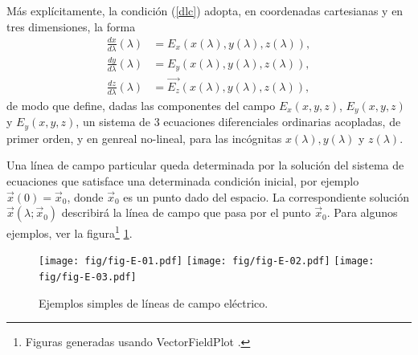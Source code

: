 Más explícitamente, la condición (\ref{dlc}) adopta, en coordenadas cartesianas y en tres dimensiones, la forma 
\begin{align}
\frac{dx}{d\lambda}(\lambda) &= {E_x}(x(\lambda),y(\lambda),z(\lambda)), \\
\frac{dy}{d\lambda}(\lambda) &= {E_y}(x(\lambda),y(\lambda),z(\lambda)),\\
\frac{dz}{d\lambda}(\lambda) &= \vec{E_z}(x(\lambda),y(\lambda),z(\lambda)),
\end{align}
de modo que define, dadas las componentes del campo $E_x(x,y,z)$, $E_y(x,y,z)$ y $E_y(x,y,z)$, un sistema de 3 ecuaciones diferenciales ordinarias acopladas, de primer orden, y en genreal no-lineal, para las incógnitas $x(\lambda),y(\lambda)$ y $z(\lambda)$.

Una línea de campo particular queda determinada por la solución del sistema de ecuaciones que satisface una determinada condición inicial, por ejemplo $\vec{x}(0)=\vec{x}_0$, donde $\vec{x}_0$ es un punto dado del espacio. La correspondiente solución $\vec{x}(\lambda;\vec{x}_0)$ describirá la línea de campo que pasa por el punto $\vec{x}_0$. Para algunos ejemplos, ver la figura\footnote{Figuras generadas usando VectorFieldPlot \cite{VFP}.} \ref{fig-E}.

\begin{center}
\begin{figure}[H]
\centerline{\texttt{[image: fig/fig-E-01.pdf]}\hfill 
\texttt{[image: fig/fig-E-02.pdf]}\hfill
\texttt{[image: fig/fig-E-03.pdf]}}
\caption{Ejemplos simples de líneas de campo eléctrico.}
\label{fig-E}
\end{figure}
\end{center}
